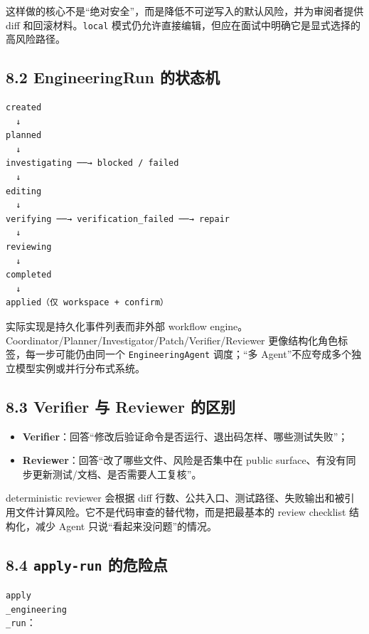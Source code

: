 \documentclass[UTF8,12pt,openany]{ctexbook}
\begin{document}
这样做的核心不是“绝对安全”，而是降低不可逆写入的默认风险，并为审阅者提供 diff 和回滚材料。\texttt{local} 模式仍允许直接编辑，但应在面试中明确它是显式选择的高风险路径。\par

\subsection{8.2 EngineeringRun 的状态机}

\begin{lstlisting}
created
  ↓
planned
  ↓
investigating ──→ blocked / failed
  ↓
editing
  ↓
verifying ──→ verification_failed ──→ repair
  ↓
reviewing
  ↓
completed
  ↓
applied（仅 workspace + confirm）
\end{lstlisting}

实际实现是持久化事件列表而非外部 workflow engine。Coordinator/Planner/Investigator/Patch/Verifier/Reviewer 更像结构化角色标签，每一步可能仍由同一个 \texttt{EngineeringAgent} 调度；“多 Agent”不应夸成多个独立模型实例或并行分布式系统。\par

\subsection{8.3 Verifier 与 Reviewer 的区别}

\begin{itemize}
\item \textbf{Verifier}：回答“修改后验证命令是否运行、退出码怎样、哪些测试失败”；
\item \textbf{Reviewer}：回答“改了哪些文件、风险是否集中在 public surface、有没有同步更新测试/文档、是否需要人工复核”。
\end{itemize}

deterministic reviewer 会根据 diff 行数、公共入口、测试路径、失败输出和被引用文件计算风险。它不是代码审查的替代物，而是把最基本的 review checklist 结构化，减少 Agent 只说“看起来没问题”的情况。\par

\subsection{8.4 \texttt{apply-run} 的危险点}

\texttt{apply\\_engineering\\_run}：\par
\end{document}
